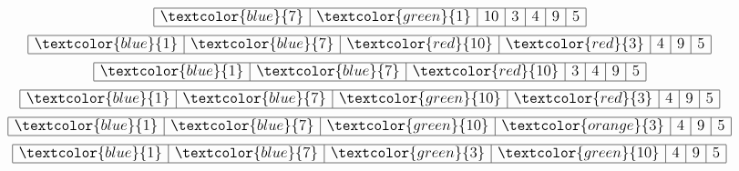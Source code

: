 \documentclass{article}
\begin{document}
\begin{minipage}{0.5\textwidth}
\begin{equation*}
\begin{array}{|r|r|r|r|r|r|r|}
  \end{array}
\end{equation*}
\begin{equation*}
  \large
  \begin{array}{|r|r|r|r|r|r|r|}
    \hline \textcolor{blue}{7} & \textcolor{green}{1} & 10 & 3 & 4 & 9 & 5 \\ \hline
  \end{array}
\end{equation*}
\begin{equation*}
  \large
  \begin{array}{|r|r|r|r|r|r|r|}
    \hline \textcolor{blue}{1} & \textcolor{blue}{7} & \textcolor{red}{10} & \textcolor{red}{3} & 4 & 9 & 5 \\ \hline
  \end{array}
\end{equation*}
\begin{equation*}
  \large
  \begin{array}{|r|r|r|r|r|r|r|}
    \hline \textcolor{blue}{1} & \textcolor{blue}{7} & \textcolor{red}{10} & 3 & 4 & 9 & 5 \\ \hline
  \end{array}
\end{equation*}
\begin{equation*}
  \large
  \begin{array}{|r|r|r|r|r|r|r|}
    \hline \textcolor{blue}{1} & \textcolor {blue}{7} & \textcolor{green}{10} & \textcolor{red}{3} & 4 & 9 & 5 \\ \hline
  \end{array}
\end{equation*}
\begin{equation*}
  \large
  \begin{array}{|r|r|r|r|r|r|r|}
    \hline \textcolor{blue}{1} & \textcolor {blue}{7} & \textcolor{green}{10} & \textcolor{orange}{3} & 4 & 9 & 5 \\ \hline
  \end{array}
\end{equation*}
\begin{equation*}
  \large
  \begin{array}{|r|r|r|r|r|r|r|}
    \hline \textcolor{blue}{1} & \textcolor {blue}{7} & \textcolor{green}{3} & \textcolor{green}{10} & 4 & 9 & 5 \\ \hline
  \end{array}
\end{equation*}
\end{minipage}
\end{document}
